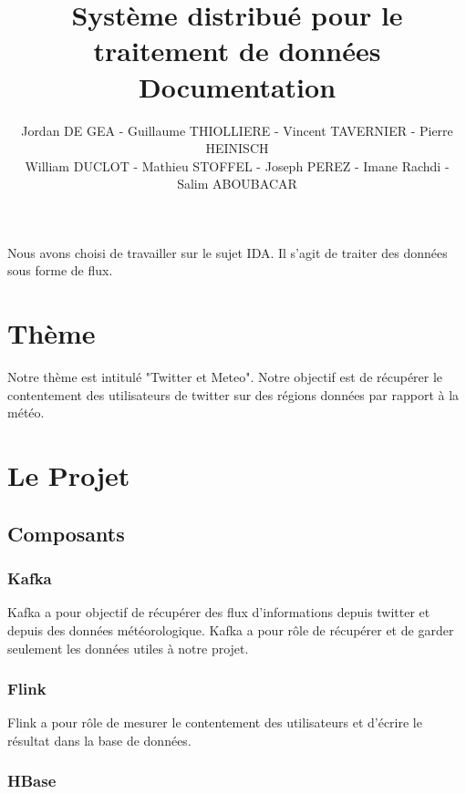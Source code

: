 \documentclass[a4paper,oneside,10pt]{article}
\title{Système distribué pour le traitement de données\\
Documentation
}
\author{Jordan DE GEA - Guillaume THIOLLIERE - Vincent TAVERNIER - Pierre HEINISCH\\
William DUCLOT - Mathieu STOFFEL - Joseph PEREZ - Imane Rachdi - Salim ABOUBACAR}
\begin{document}
\maketitle

Nous avons choisi de travailler sur le sujet IDA. Il s'agit de traiter des données sous forme de flux. \\

\section{Thème} 

Notre thème est intitulé "Twitter et Meteo". Notre objectif est de récupérer le contentement des utilisateurs de twitter sur des régions données par rapport à la météo. 

\section{Le Projet}

\subsection{Composants}

\subsubsection{Kafka}

Kafka a pour objectif de récupérer des flux d'informations depuis twitter et depuis des données météorologique. Kafka a pour rôle de récupérer et de garder seulement les données utiles à notre projet. 

\subsubsection{Flink}
Flink a pour rôle de mesurer le contentement des utilisateurs et d'écrire le résultat dans la base de données. 

\subsubsection{HBase}
\end{document}
